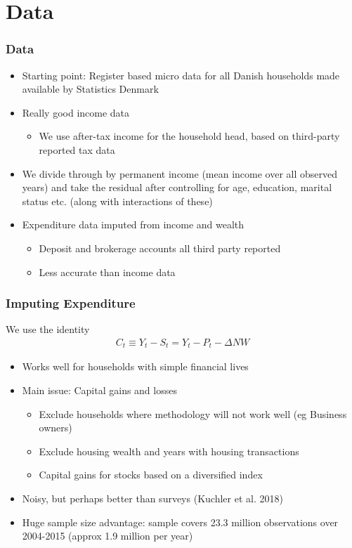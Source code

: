 \documentclass{beamer}
\begin{document}
\section{Data}
\frame
{
	\frametitle{Data}
	\begin{itemize}
		\item Starting point: Register based micro data for all Danish households made available by Statistics Denmark
		\item Really good income data
		\begin{itemize}
			\item We use after-tax income for the household head, based on third-party reported tax data
		\end{itemize}
		\item We divide through by permanent income (mean income over all observed years) and take the residual after controlling for age, education, marital status etc. (along with interactions of these)
		\item Expenditure data imputed from income and wealth
		\begin{itemize}
			\item Deposit and brokerage accounts all third party reported
			\item Less accurate than income data
		\end{itemize}
	\end{itemize}
}
\frame
{
	\frametitle{Imputing Expenditure}
	We use the identity
		\begin{align*}
			C_t \equiv Y_t - S_t = Y_t - P_t - \Delta NW
		\end{align*}
	\begin{itemize}
		\item Works well for households with simple financial lives
		\item Main issue: Capital gains and losses
		\begin{itemize}
			\item Exclude households where methodology will not work well (eg Business owners)
			\item Exclude housing wealth and years with housing transactions
			\item Capital gains for stocks based on a diversified index
		\end{itemize}
		\item Noisy, but perhaps better than surveys (Kuchler et al. 2018)
		\item Huge sample size advantage: sample covers 23.3 million observations over 2004-2015 (approx 1.9 million per year)
	\end{itemize}
}
\end{document}
